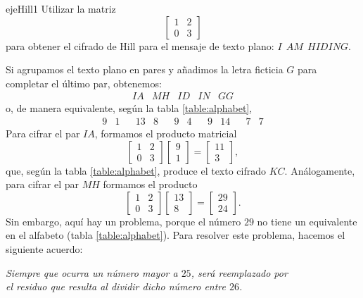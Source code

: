 \begin{examplebox}{}{ejeHill1}
    Utilizar la matriz
    $$\begin{bmatrix}
        1 & 2 \\
        0 & 3
    \end{bmatrix}$$
    para obtener el cifrado de Hill para el mensaje de texto plano: $I ~~ AM ~~ HIDING$.

    \tcblower
    \solucion Si agrupamos el texto plano en pares y añadimos la letra ficticia $G$ para completar el último par, obtenemos:
    $$\begin{array}{ccccc}
        IA & MH & ID & IN & GG
    \end{array}$$
    o, de manera equivalente, según la tabla \ref{table:alphabet},
    $$\begin{array}{cccccccccccccc}
        9 & 1 & & 13 & 8 & & 9 & 4 & & 9 & 14 & & 7 & 7
    \end{array}$$
    Para cifrar el par $IA$, formamos el producto matricial
    $$\begin{bmatrix}
        1 & 2 \\
        0 & 3
    \end{bmatrix} \begin{bmatrix}
        9 \\
        1
    \end{bmatrix} = \begin{bmatrix}
        11 \\
        3
    \end{bmatrix},$$
    que, según la tabla \ref{table:alphabet}, produce el texto cifrado $KC$. Análogamente, para cifrar el par $MH$ formamos el producto
    $$\begin{bmatrix}
        1 & 2 \\
        0 & 3
    \end{bmatrix} \begin{bmatrix}
        13 \\
        8
    \end{bmatrix} = \begin{bmatrix}
        29 \\
        24
    \end{bmatrix}.$$
    Sin embargo, aquí hay un problema, porque el número $29$ no tiene un equivalente en el alfabeto (tabla \ref{table:alphabet}). Para resolver este problema, hacemos el siguiente acuerdo:
    \begin{nscenter}
        \itshape Siempre que ocurra un número mayor a $25$, será reemplazado por \\ el residuo que resulta al dividir dicho número entre $26$.

\end{nscenter}
\end{examplebox}
